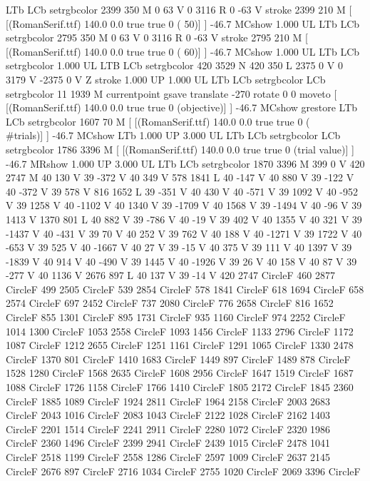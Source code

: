 LTb
LCb setrgbcolor
2399 350 M
0 63 V
0 3116 R
0 -63 V
stroke
2399 210 M
[ [(RomanSerif.ttf) 140.0 0.0 true true 0 ( 50)]
] -46.7 MCshow
1.000 UL
LTb
LCb setrgbcolor
2795 350 M
0 63 V
0 3116 R
0 -63 V
stroke
2795 210 M
[ [(RomanSerif.ttf) 140.0 0.0 true true 0 ( 60)]
] -46.7 MCshow
1.000 UL
LTb
LCb setrgbcolor
1.000 UL
LTB
LCb setrgbcolor
420 3529 N
420 350 L
2375 0 V
0 3179 V
-2375 0 V
Z stroke
1.000 UP
1.000 UL
LTb
LCb setrgbcolor
LCb setrgbcolor
11 1939 M
currentpoint gsave translate -270 rotate 0 0 moveto
[ [(RomanSerif.ttf) 140.0 0.0 true true 0 (objective)]
] -46.7 MCshow
grestore
LTb
LCb setrgbcolor
1607 70 M
[ [(RomanSerif.ttf) 140.0 0.0 true true 0 (\\#trials)]
] -46.7 MCshow
LTb
1.000 UP
3.000 UL
LTb
LCb setrgbcolor
LCb setrgbcolor
1786 3396 M
[ [(RomanSerif.ttf) 140.0 0.0 true true 0 (trial value)]
] -46.7 MRshow
1.000 UP
3.000 UL
LTb
LCb setrgbcolor
1870 3396 M
399 0 V
420 2747 M
40 130 V
39 -372 V
40 349 V
578 1841 L
40 -147 V
40 880 V
39 -122 V
40 -372 V
39 578 V
816 1652 L
39 -351 V
40 430 V
40 -571 V
39 1092 V
40 -952 V
39 1258 V
40 -1102 V
40 1340 V
39 -1709 V
40 1568 V
39 -1494 V
40 -96 V
39 1413 V
1370 801 L
40 882 V
39 -786 V
40 -19 V
39 402 V
40 1355 V
40 321 V
39 -1437 V
40 -431 V
39 70 V
40 252 V
39 762 V
40 188 V
40 -1271 V
39 1722 V
40 -653 V
39 525 V
40 -1667 V
40 27 V
39 -15 V
40 375 V
39 111 V
40 1397 V
39 -1839 V
40 914 V
40 -490 V
39 1445 V
40 -1926 V
39 26 V
40 158 V
40 87 V
39 -277 V
40 1136 V
2676 897 L
40 137 V
39 -14 V
420 2747 CircleF
460 2877 CircleF
499 2505 CircleF
539 2854 CircleF
578 1841 CircleF
618 1694 CircleF
658 2574 CircleF
697 2452 CircleF
737 2080 CircleF
776 2658 CircleF
816 1652 CircleF
855 1301 CircleF
895 1731 CircleF
935 1160 CircleF
974 2252 CircleF
1014 1300 CircleF
1053 2558 CircleF
1093 1456 CircleF
1133 2796 CircleF
1172 1087 CircleF
1212 2655 CircleF
1251 1161 CircleF
1291 1065 CircleF
1330 2478 CircleF
1370 801 CircleF
1410 1683 CircleF
1449 897 CircleF
1489 878 CircleF
1528 1280 CircleF
1568 2635 CircleF
1608 2956 CircleF
1647 1519 CircleF
1687 1088 CircleF
1726 1158 CircleF
1766 1410 CircleF
1805 2172 CircleF
1845 2360 CircleF
1885 1089 CircleF
1924 2811 CircleF
1964 2158 CircleF
2003 2683 CircleF
2043 1016 CircleF
2083 1043 CircleF
2122 1028 CircleF
2162 1403 CircleF
2201 1514 CircleF
2241 2911 CircleF
2280 1072 CircleF
2320 1986 CircleF
2360 1496 CircleF
2399 2941 CircleF
2439 1015 CircleF
2478 1041 CircleF
2518 1199 CircleF
2558 1286 CircleF
2597 1009 CircleF
2637 2145 CircleF
2676 897 CircleF
2716 1034 CircleF
2755 1020 CircleF
2069 3396 CircleF
